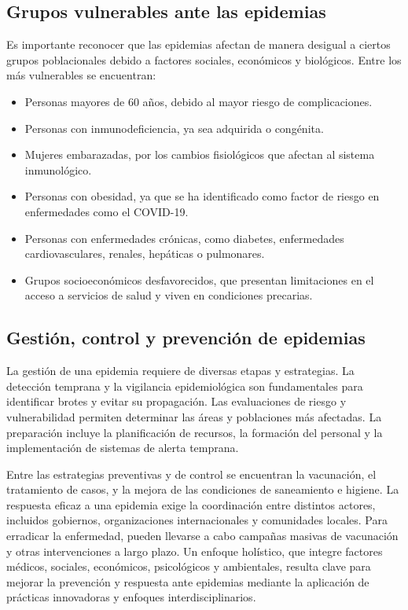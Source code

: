 \subsection{Grupos vulnerables ante las epidemias}
Es importante reconocer que las epidemias afectan de manera desigual a ciertos grupos poblacionales debido a factores sociales, económicos y biológicos. Entre los más vulnerables se encuentran:
\begin{itemize}
  \item Personas mayores de 60 años, debido al mayor riesgo de complicaciones.
  \item Personas con inmunodeficiencia, ya sea adquirida o congénita.
  \item Mujeres embarazadas, por los cambios fisiológicos que afectan al sistema inmunológico.
   \item Personas con obesidad, ya que se ha identificado como factor de riesgo en enfermedades como el COVID-19.
   \item Personas con enfermedades crónicas, como diabetes, enfermedades cardiovasculares, renales, hepáticas o pulmonares.
   \item Grupos socioeconómicos desfavorecidos, que presentan limitaciones en el acceso a servicios de salud y viven en condiciones precarias. 
\end{itemize}

\subsection{Gestión, control y prevención de epidemias}
La gestión de una epidemia requiere de diversas etapas y estrategias. La detección temprana y la vigilancia epidemiológica son fundamentales para identificar brotes y evitar su propagación. Las evaluaciones de riesgo y vulnerabilidad permiten determinar las áreas y poblaciones más afectadas. La preparación incluye la planificación de recursos, la formación del personal y la implementación de sistemas de alerta temprana.

Entre las estrategias preventivas y de control se encuentran la vacunación, el tratamiento de casos, y la mejora de las condiciones de saneamiento e higiene. La respuesta eficaz a una epidemia exige la coordinación entre distintos actores, incluidos gobiernos, organizaciones internacionales y comunidades locales. Para erradicar la enfermedad, pueden llevarse a cabo campañas masivas de vacunación y otras intervenciones a largo plazo. Un enfoque holístico, que integre factores médicos, sociales, económicos, psicológicos y ambientales, resulta clave para mejorar la prevención y respuesta ante epidemias mediante la aplicación de prácticas innovadoras y enfoques interdisciplinarios.

